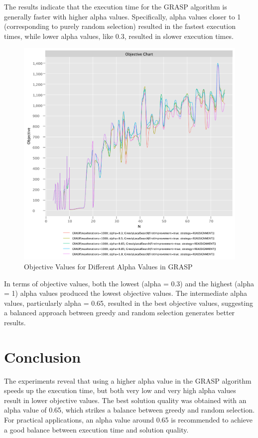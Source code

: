 \documentclass{article}
\begin{document}
The results indicate that the execution time for the GRASP algorithm is generally faster with higher alpha values. Specifically, alpha values closer to 1 (corresponding to purely random selection) resulted in the fastest execution times, while lower alpha values, like 0.3, resulted in slower execution times.

\begin{figure}[!h]
    \centering
    \includegraphics[width=1\textwidth]{./documentation/assets/new.GRASPParams.objectiveChart.pdf}
    \caption{Objective Values for Different Alpha Values in GRASP}
    \label{fig:grasp_objective}
\end{figure}\FloatBarrier

In terms of objective values, both the lowest (alpha = 0.3) and the highest (alpha = 1) alpha values produced the lowest objective values. The intermediate alpha values, particularly alpha = 0.65, resulted in the best objective values, suggesting a balanced approach between greedy and random selection generates better results.

\section*{Conclusion}
The experiments reveal that using a higher alpha value in the GRASP algorithm speeds up the execution time, but both very low and very high alpha values result in lower objective values. The best solution quality was obtained with an alpha value of 0.65, which strikes a balance between greedy and random selection. For practical applications, an alpha value around 0.65 is recommended to achieve a good balance between execution time and solution quality.
\end{document}
